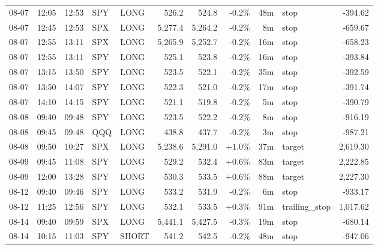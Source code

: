 \documentclass[11pt,a4paper,twoside]{article}
\begin{document}
\begin{center}
\begin{longtable}{>{\color{txtmain}}l l l l l r r r r >{\color{txtmain}}l r}
08-07 & 12:05 & 12:53 & SPY & LONG & 526.2 & 524.8 & \textcolor{lossred}{-0.2\%} & 48m & stop & \textcolor{lossred}{-394.62} \\
08-07 & 12:45 & 12:53 & SPX & LONG & 5,277.4 & 5,264.2 & \textcolor{lossred}{-0.2\%} & 8m & stop & \textcolor{lossred}{-659.67} \\
08-07 & 12:55 & 13:11 & SPX & LONG & 5,265.9 & 5,252.7 & \textcolor{lossred}{-0.2\%} & 16m & stop & \textcolor{lossred}{-658.23} \\
08-07 & 12:55 & 13:11 & SPY & LONG & 525.1 & 523.8 & \textcolor{lossred}{-0.2\%} & 16m & stop & \textcolor{lossred}{-393.84} \\
08-07 & 13:15 & 13:50 & SPY & LONG & 523.5 & 522.1 & \textcolor{lossred}{-0.2\%} & 35m & stop & \textcolor{lossred}{-392.59} \\
08-07 & 13:50 & 14:07 & SPY & LONG & 522.3 & 521.0 & \textcolor{lossred}{-0.2\%} & 17m & stop & \textcolor{lossred}{-391.74} \\
08-07 & 14:10 & 14:15 & SPY & LONG & 521.1 & 519.8 & \textcolor{lossred}{-0.2\%} & 5m & stop & \textcolor{lossred}{-390.79} \\
08-08 & 09:40 & 09:48 & SPY & LONG & 523.5 & 522.2 & \textcolor{lossred}{-0.2\%} & 8m & stop & \textcolor{lossred}{-916.19} \\
08-08 & 09:45 & 09:48 & QQQ & LONG & 438.8 & 437.7 & \textcolor{lossred}{-0.2\%} & 3m & stop & \textcolor{lossred}{-987.21} \\
08-08 & 09:50 & 10:27 & SPX & LONG & 5,238.6 & 5,291.0 & \textcolor{wingreen}{+1.0\%} & 37m & target & \textcolor{wingreen}{2,619.30} \\
08-09 & 09:45 & 11:08 & SPY & LONG & 529.2 & 532.4 & \textcolor{wingreen}{+0.6\%} & 83m & target & \textcolor{wingreen}{2,222.85} \\
08-09 & 12:00 & 13:28 & SPY & LONG & 530.3 & 533.5 & \textcolor{wingreen}{+0.6\%} & 88m & target & \textcolor{wingreen}{2,227.30} \\
08-12 & 09:40 & 09:46 & SPY & LONG & 533.2 & 531.9 & \textcolor{lossred}{-0.2\%} & 6m & stop & \textcolor{lossred}{-933.17} \\
08-12 & 11:25 & 12:56 & SPY & LONG & 532.1 & 533.5 & \textcolor{wingreen}{+0.3\%} & 91m & trailing\_stop & \textcolor{wingreen}{1,017.62} \\
08-14 & 09:40 & 09:59 & SPX & LONG & 5,441.1 & 5,427.5 & \textcolor{lossred}{-0.3\%} & 19m & stop & \textcolor{lossred}{-680.14} \\
08-14 & 10:15 & 11:03 & SPY & SHORT & 541.2 & 542.5 & \textcolor{lossred}{-0.2\%} & 48m & stop & \textcolor{lossred}{-947.06} \\

\end{longtable}
\end{center}
\end{document}
